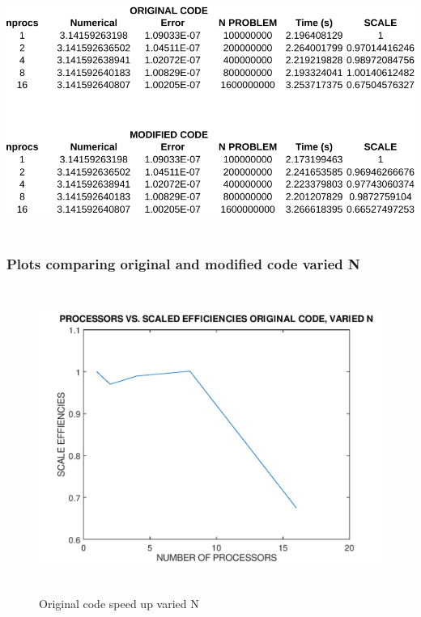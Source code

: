 \documentclass[12pt]{article}
\begin{document}
	\begin{center}	
		\includegraphics[width = 150mm,height = 80mm]{variedN_final-crop}
	\end{center}

	\subsubsection{Plots comparing original and modified code varied N}

	\begin{figure}[H]
		\hfill\includegraphics[width=150mm,height= 100mm]{varied_ori.png}\hspace*{\fill}
		\caption{Original code speed up varied N}
	\end{figure}
\end{document}

